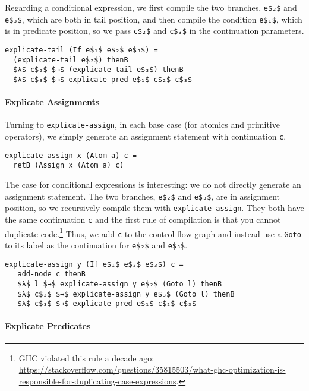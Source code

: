 \documentclass[sigplan,review,dvipsnames,screen,10pt]{acmart}
\begin{document}
\noindent Regarding a conditional expression, we first compile the two
branches, \lstinline{e$₂$} and \lstinline{e$₃$}, which are both in tail
position, and then compile the condition \lstinline{e$₁$}, which is in
predicate position, so we pass \lstinline{c$₂$} and \lstinline{c$₃$} in
the continuation parameters.

\begin{lstlisting}
explicate-tail (If e$₁$ e$₂$ e$₃$) =
  (explicate-tail e$₂$) thenB
  $λ$ c$₂$ $→$ (explicate-tail e$₃$) thenB
  $λ$ c$₃$ $→$ explicate-pred e$₁$ c$₂$ c$₃$
\end{lstlisting}

\paragraph{Explicate Assignments}

Turning to \lstinline{explicate-assign}, in each base case (for
atomics and primitive operators), we simply generate an assignment
statement with continuation \lstinline{c}.

\begin{lstlisting}
explicate-assign x (Atom a) c =
  retB (Assign x (Atom a) c)
\end{lstlisting}

The case for conditional expressions is interesting: we do not
directly generate an assignment statement. The two branches,
\lstinline{e$₂$} and \lstinline{e$₃$}, are in assignment position,
so we recursively compile them with \lstinline{explicate-assign}.
They both have the same continuation \lstinline{c} and the first rule
of compilation is that you cannot duplicate code.\footnote{GHC
violated this rule a decade ago:
\url{https://stackoverflow.com/questions/35815503/what-ghc-optimization-is-responsible-for-duplicating-case-expressions}.}
Thus, we add \lstinline{c} to the control-flow graph and
instead use a \lstinline{Goto} to its label as the continuation
for \lstinline{e$₂$} and \lstinline{e$₃$}.

\begin{lstlisting}
explicate-assign y (If e$₁$ e$₂$ e$₃$) c =
   add-node c thenB
   $λ$ l $→$ explicate-assign y e$₂$ (Goto l) thenB
   $λ$ c$₂$ $→$ explicate-assign y e$₃$ (Goto l) thenB
   $λ$ c$₃$ $→$ explicate-pred e$₁$ c$₂$ c$₃$
\end{lstlisting}

\paragraph{Explicate Predicates}
\end{document}
